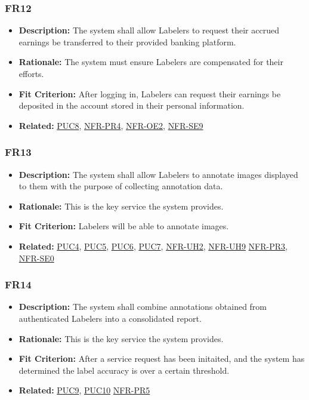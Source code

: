 \documentclass[12pt]{article}
\begin{document}
\subsubsection*{FR12}
\label{sec:FR12}
\begin{itemize}
  \item \textbf{Description:} The system shall allow Labelers to request their accrued earnings be transferred to their provided banking platform.
  \item \textbf{Rationale:} The system must ensure Labelers are compensated for their efforts.
\item \textbf{Fit Criterion:} After logging in, Labelers can request their earnings be deposited in the account stored in their personal information.
\item \textbf{Related:}  \hyperref[sec:PUC8]{PUC8}, \hyperref[sec:PR4]{NFR-PR4}, \hyperref[sec:OE2]{NFR-OE2}, \hyperref[sec:SE9]{NFR-SE9}
\end{itemize}
\subsubsection*{FR13}
\label{sec:FR13}
\begin{itemize}
  \item \textbf{Description:} The system shall allow Labelers to annotate images displayed to them with the purpose of collecting annotation data.
  \item \textbf{Rationale:} This is the key service the system provides.
  \item \textbf{Fit Criterion:} Labelers will be able to annotate images.
  \item \textbf{Related:} \hyperref[sec:PUC4]{PUC4}, \hyperref[sec:PUC5]{PUC5}, \hyperref[sec:PUC6]{PUC6}, \hyperref[sec:PUC7]{PUC7}, \hyperref[sec:UH2]{NFR-UH2}, \hyperref[sec:UH9]{NFR-UH9} \hyperref[sec:PR3]{NFR-PR3}, \hyperref[sec:SE0]{NFR-SE0}
\end{itemize}
\subsubsection*{FR14}
\label{sec:FR14}
\begin{itemize}
  \item \textbf{Description:} The system shall combine annotations obtained from authenticated Labelers into a consolidated report.
  \item \textbf{Rationale:} This is the key service the system provides.
  \item \textbf{Fit Criterion:} After a service request has been initaited, and the system has determined the label accuracy is over a certain threshold.
  \item \textbf{Related:} \hyperref[sec:PUC9]{PUC9}, \hyperref[sec:PUC10]{PUC10} \hyperref[sec:PR5]{NFR-PR5}
\end{itemize}
\end{document}
